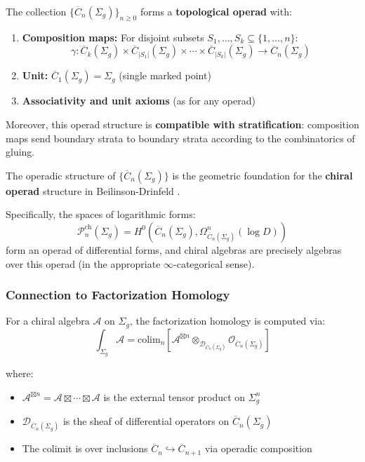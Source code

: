 \begin{theorem}\label{thm:FM-operad}
The collection $\{\overline{C}_n(\Sigma_g)\}_{n \geq 0}$ forms a \textbf{topological operad} with:

\begin{enumerate}
\item \textbf{Composition maps:} For disjoint subsets $S_1, \ldots, S_k \subseteq \{1,\ldots,n\}$:
$$\gamma: \overline{C}_k(\Sigma_g) \times \overline{C}_{|S_1|}(\Sigma_g) \times \cdots \times \overline{C}_{|S_k|}(\Sigma_g) \to \overline{C}_n(\Sigma_g)$$

\item \textbf{Unit:} $\overline{C}_1(\Sigma_g) = \Sigma_g$ (single marked point)

\item \textbf{Associativity and unit axioms} (as for any operad)
\end{enumerate}

Moreover, this operad structure is \textbf{compatible with stratification}: composition maps send boundary strata to boundary strata according to the combinatorics of gluing.
\end{theorem}

\begin{remark}\label{rem:chiral-operad}
The operadic structure of $\{\overline{C}_n(\Sigma_g)\}$ is the geometric foundation for the \textbf{chiral operad} structure in Beilinson-Drinfeld \cite{BD04}.

Specifically, the spaces of logarithmic forms:
$$\mathcal{P}^{\text{ch}}_n(\Sigma_g) = H^0(\overline{C}_n(\Sigma_g), \Omega^n_{\overline{C}_n(\Sigma_g)}(\log D))$$
form an operad of differential forms, and chiral algebras are precisely algebras over this operad (in the appropriate $\infty$-categorical sense).
\end{remark}

\subsubsection{Connection to Factorization Homology}

\begin{theorem}\label{thm:fact-homology}
For a chiral algebra $\mathcal{A}$ on $\Sigma_g$, the factorization homology is computed via:
$$\int_{\Sigma_g} \mathcal{A} = \text{colim}_n \left[ \mathcal{A}^{\boxtimes n} \otimes_{\mathcal{D}_{\overline{C}_n(\Sigma_g)}} \mathcal{O}_{\overline{C}_n(\Sigma_g)} \right]$$

where:
\begin{itemize}
\item $\mathcal{A}^{\boxtimes n} = \mathcal{A} \boxtimes \cdots \boxtimes \mathcal{A}$ is the external tensor product on $\Sigma_g^n$
\item $\mathcal{D}_{\overline{C}_n(\Sigma_g)}$ is the sheaf of differential operators on $\overline{C}_n(\Sigma_g)$
\item The colimit is over inclusions $\overline{C}_n \hookrightarrow \overline{C}_{n+1}$ via operadic composition
\end{itemize}
\end{theorem}

